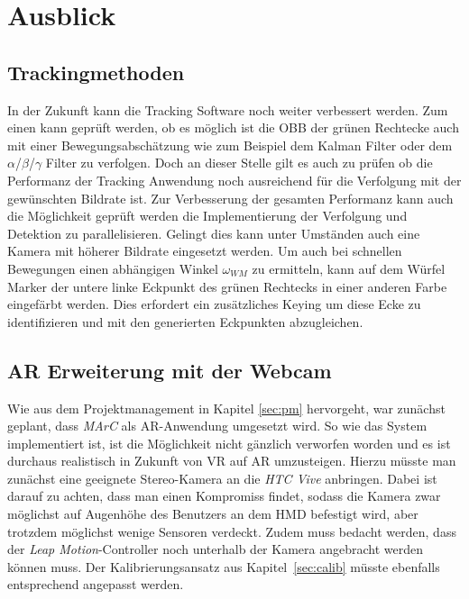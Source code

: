 \section{Ausblick}
\subsection{Trackingmethoden}
In der Zukunft kann die Tracking Software noch weiter verbessert werden. Zum einen kann geprüft werden, ob es möglich ist die OBB der grünen Rechtecke auch mit einer Bewegungsabschätzung wie zum Beispiel dem Kalman Filter \cite{article:Kalman} oder dem $\alpha$/$\beta$/$\gamma$ Filter \cite{article:alphabetagamma} zu verfolgen. Doch an dieser Stelle gilt es auch zu prüfen ob die Performanz der Tracking Anwendung noch ausreichend für die Verfolgung mit der gewünschten Bildrate ist. Zur Verbesserung der gesamten Performanz kann auch die Möglichkeit geprüft werden die Implementierung der Verfolgung und Detektion zu parallelisieren. Gelingt dies kann unter Umständen auch eine Kamera mit höherer Bildrate eingesetzt werden.
Um auch bei schnellen Bewegungen einen abhängigen Winkel $\omega_{WM}$ zu ermitteln, kann auf dem Würfel Marker der untere linke Eckpunkt des grünen Rechtecks in einer anderen Farbe eingefärbt werden. Dies erfordert ein zusätzliches Keying um diese Ecke zu identifizieren und mit den generierten Eckpunkten abzugleichen.

\subsection{AR Erweiterung mit der Webcam} \label{sec:PlanedWebcam}
Wie aus dem Projektmanagement in Kapitel \ref{sec:pm} hervorgeht, war zunächst geplant, dass \textit{MArC} als AR-Anwendung umgesetzt wird. So wie das System implementiert ist, ist die Möglichkeit nicht gänzlich verworfen worden und es ist durchaus realistisch in Zukunft von VR auf AR umzusteigen. Hierzu müsste man zunächst eine geeignete Stereo-Kamera an die \textit{HTC Vive} anbringen. Dabei ist darauf zu achten, dass man einen Kompromiss findet, sodass die Kamera zwar möglichst auf Augenhöhe des Benutzers an dem HMD befestigt wird, aber trotzdem möglichst wenige Sensoren verdeckt. Zudem muss bedacht werden, dass der \textit{Leap Motion}-Controller noch unterhalb der Kamera angebracht werden können muss. Der Kalibrierungsansatz aus Kapitel~\ref{sec:calib} müsste ebenfalls entsprechend angepasst werden. 

